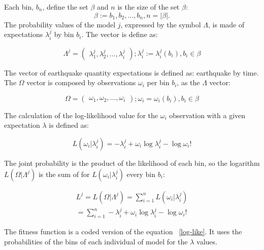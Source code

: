 Each bin, $b_n$, define the set $\beta$ and $n$ is the size of the set $\beta$:
\begin{equation} 
\beta := {b_1,b_2,...,b_n},n = |\beta|.
\end{equation}
The probability values of the model $j$, expressed by the symbol
$\Lambda$, is made of expectations $\lambda_i^j$ by bin $b_i$. The
vector is define as:
				
\begin{equation}
	\Lambda^j = 
\begin{pmatrix}
    \lambda_1^j, 
    \lambda_2^j, 
    \hdots,
    \lambda_i^j
  \end{pmatrix}
  ;\lambda_i^j := \lambda_i^j(b_i),b_i \in \beta
\end{equation}
		
The vector of earthquake quantity expectations is defined as:
earthquake by time. The $\Omega$ vector is composed by observations
$\omega_i$ per bin $b_i$, as the $\Lambda$ vector:

\begin{equation}
\Omega = 
\begin{pmatrix}
    \omega_1,
    \omega_2,
    \hdots,
    \omega_i
  \end{pmatrix}
  ;\omega_i =\omega_i(b_i),b_i \in \beta
\end{equation}

The calculation of the log-likelihood value for the $\omega_i$
observation with a given expectation $\lambda$ is defined as:


\begin{equation}
	L(\omega_i|\lambda_i^j) = -\lambda_i^j + \omega_i\log\lambda_i^j - \log\omega_i!
\end{equation}

The joint probability is the product of the likelihood of each bin, so
the logarithm $L(\Omega|\Lambda^j)$ is the sum of for
$L(\omega_i|\lambda_i^j)$ every bin $b_i$:

\begin{equation}\label{log-like}
\begin{split}
	L^j = L(\Omega|\Lambda^j) = \sum_{i=1}^{n}L(\omega_i|\lambda_i^j)  \\
	= \sum_{i=1}^{n} -\lambda_i^j + \omega_i\log\lambda_i^j - \log\omega_i!  
\end{split}
\end{equation}

The fitness function is a coded version of the equation
~\ref{log-like}. It uses the probabilities of the bins of each
individual of model for the $\lambda$ values.\\
				
